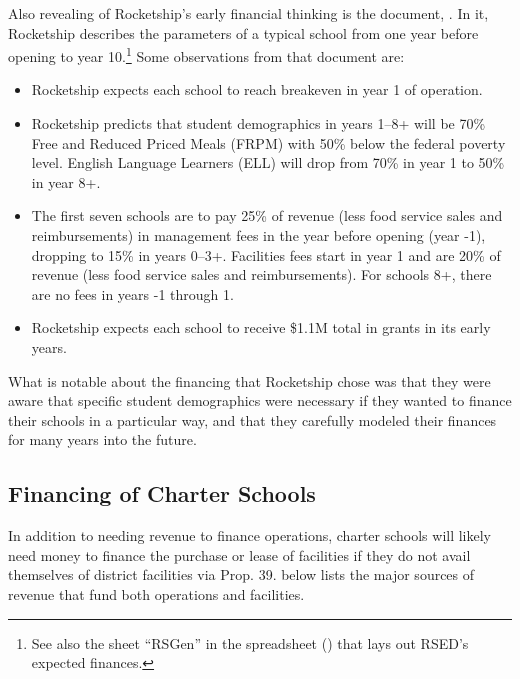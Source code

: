 Also revealing of Rocketship's early financial thinking is the document,  \parencite{FinNarr2010}. In it, Rocketship describes the parameters of a typical school from one year before opening to year 10.\footnote{See also the sheet ``RSGen'' in the spreadsheet  (\parencite{RSED2009a}) that lays out RSED's expected finances.} Some observations from that document are:
\begin{itemize}
  \item Rocketship expects each school to reach breakeven in year 1 of operation.
  \item Rocketship predicts that student demographics in years 1–8+ will be 70\% Free and Reduced Priced Meals (FRPM) with 50\% below the federal poverty level. English Language Learners (ELL) will drop from 70\% in year 1 to 50\% in year 8+.
  \item The first seven schools are to pay 25\% of revenue (less food service sales and reimbursements) in management fees in the year before opening (year -1), dropping to 15\% in years 0–3+. Facilities fees start in year 1 and are 20\% of revenue (less food service sales and reimbursements). For schools 8+, there are no fees in years -1 through 1.
  \item Rocketship expects each school to receive \$1.1M total in grants in its early years.
\end{itemize}
What is notable about the financing that Rocketship chose was that they were aware that specific student demographics were necessary if they wanted to finance their schools in a particular way, and that they carefully modeled their finances for many years into the future. 

\subsection{Financing of Charter Schools}%
\label{sec:financing_charter_schools}\indent%

In addition to needing revenue to finance operations, charter schools will likely need money to finance the purchase or lease of facilities if they do not avail themselves of district facilities via Prop. 39.  below lists the major sources of revenue that fund both operations and facilities.

